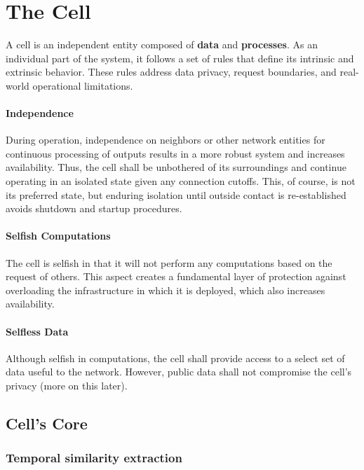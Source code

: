 \section{The Cell}

A cell is an independent entity composed of \textbf{data} and \textbf{processes}. As an individual part of the system, it follows a set of rules that define its intrinsic and extrinsic behavior. These rules address data privacy, request boundaries, and real-world operational limitations.

\paragraph*{Independence} During operation, independence on neighbors or other network entities for continuous processing of outputs results in a more robust system and increases availability. Thus, the cell shall be unbothered of its surroundings and continue operating in an isolated state given any connection cutoffs. This, of course, is not its preferred state, but enduring isolation until outside contact is re-established avoids shutdown and startup procedures. 

\paragraph*{Selfish Computations} The cell is selfish in that it will not perform any computations based on the request of others. This aspect creates a fundamental layer of protection against overloading the infrastructure in which it is deployed, which also increases availability.

\paragraph*{Selfless Data} Although selfish in computations, the cell shall provide access to a select set of data useful to the network. However, public data shall not compromise the cell's privacy (more on this later).

\subsection{Cell's Core}

\subsubsection{Temporal similarity extraction}

